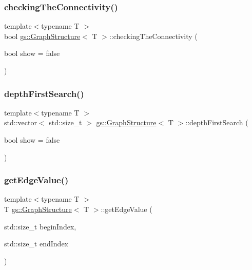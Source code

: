 \mbox{\label{classgs_1_1_graph_structure_a969a88dd678fd5b16884a6ab2cb68a60}} 
\subsubsection{\texorpdfstring{checking\+The\+Connectivity()}{checkingTheConnectivity()}}
{\footnotesize\ttfamily template$<$typename T $>$ \\
bool \mbox{\hyperlink{classgs_1_1_graph_structure}{gs\+::\+Graph\+Structure}}$<$ T $>$\+::checking\+The\+Connectivity (\begin{DoxyParamCaption}\item[{bool}]{show = {\ttfamily false} }\end{DoxyParamCaption})}

\mbox{\label{classgs_1_1_graph_structure_a6a9516f3f46cbbcdc50741e342a22ae4}} 
\subsubsection{\texorpdfstring{depth\+First\+Search()}{depthFirstSearch()}}
{\footnotesize\ttfamily template$<$typename T $>$ \\
std\+::vector$<$ std\+::size\+\_\+t $>$ \mbox{\hyperlink{classgs_1_1_graph_structure}{gs\+::\+Graph\+Structure}}$<$ T $>$\+::depth\+First\+Search (\begin{DoxyParamCaption}\item[{bool}]{show = {\ttfamily false} }\end{DoxyParamCaption})}

\mbox{\label{classgs_1_1_graph_structure_ac2e23f51a131b5a08d96cb8c75f20cea}} 
\subsubsection{\texorpdfstring{get\+Edge\+Value()}{getEdgeValue()}}
{\footnotesize\ttfamily template$<$typename T $>$ \\
T \mbox{\hyperlink{classgs_1_1_graph_structure}{gs\+::\+Graph\+Structure}}$<$ T $>$\+::get\+Edge\+Value (\begin{DoxyParamCaption}\item[{std\+::size\+\_\+t}]{begin\+Index,  }\item[{std\+::size\+\_\+t}]{end\+Index }\end{DoxyParamCaption})}

